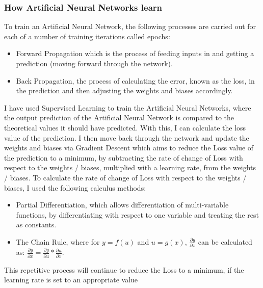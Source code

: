 \documentclass[./project-report/src/latex/project-report.tex]{subfiles}
\begin{document}
\vspace{5mm}

\subsubsection{How Artificial Neural Networks learn}
\vspace{5mm}

To train an Artificial Neural Network, the following processes are carried out for each of a number of training iterations called epochs:

\begin{itemize}
    \item Forward Propagation which is the process of feeding inputs in and getting a prediction (moving forward through the network).
    \item Back Propagation, the process of calculating the error, known as the loss, in the prediction and then adjusting the weights and biases accordingly.
\end{itemize}

I have used Supervised Learning to train the Artificial Neural Networks, where the output prediction of the Artificial Neural Network is compared to the theoretical values it should have 
predicted. With this, I can calculate the loss value of the prediction. I then move back through the network and update the weights and biases via Gradient Descent which aims to reduce 
the Loss value of the prediction to a minimum, by subtracting the rate of change of Loss with respect to the weights / biases, multiplied with a learning rate, from the weights / biases. 
To calculate the rate of change of Loss with respect to the weights / biases, I used the following calculus methods:

\begin{itemize}
    \item Partial Differentiation, which allows differentiation of multi-variable functions, by differentiating with respect to one variable and treating the rest as constants.
    \item The Chain Rule, where for $y = f(u)$ and $u = g(x)$, $\frac{\partial{y}}{\partial{x}}$ can be calculated as: $\frac{\partial{y}}{\partial{x}} = \frac{\partial{y}}{\partial{u}} * \frac{\partial{u}}{\partial{x}}$.
\end{itemize}

This repetitive process will continue to reduce the Loss to a minimum, if the learning rate is set to an appropriate value
\end{document}
